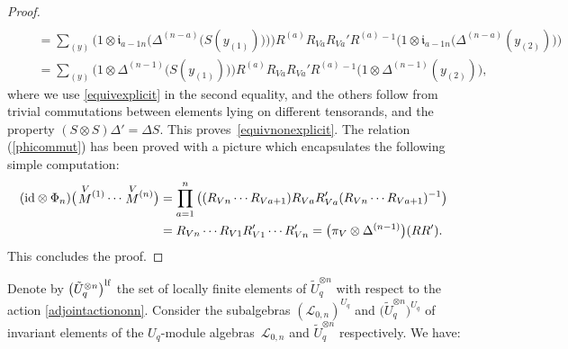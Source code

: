 \documentclass[pdftex]{sigma}%
\numberwithin{equation}{section}
\numberwithin{figure}{section}
\begin{document}
\begin{proof}
\begin{gather*}
\\ \qquad
{} = \sum_{(y)} \big(1 \otimes \mathfrak{i}_{a-1n}\big(\Delta^{(n-a)}\big( S(y_{(1)})\big)\big) \big) R^{(a)} R_{Va}R_{Va}' R^{(a)}{}^{\!-1} \big(1 \otimes \mathfrak{i}_{a-1n}\big(\Delta^{(n-a)}(y_{(2)})\big)\big)
\\ \qquad
{} = \sum_{(y)} \big(1 \otimes \Delta^{(n-1)}\big( S(y_{(1)})\big)\big) R^{(a)} R_{Va}R_{Va}' R^{(a)}{}^{\!-1} \big(1 \otimes \Delta^{(n-1)}(y_{(2)})\big),
 \end{gather*}
where we use \eqref{equivexplicit} in the second equality, and the others follow from trivial commutations between elements lying on different tensorands, and the property $( S \otimes S) \Delta' = \Delta S$. This proves~\eqref{equivnonexplicit}.
The relation (\ref{phicommut}) has been proved with a picture which encapsulates the following simple computation:
\begin{align*}
({\rm id} \otimes \Phi_n)\big(\!\stackrel{V}{M}{}^{\!\! (1)}\cdots \stackrel{V}{M}{}^{\!\! (n)}\big) & = \prod_{a=1}^{n} \big((R_{Vn}\cdots R_{Va+1}) R_{Va}R_{Va}' (R_{Vn}\cdots R_{Va+1})^{-1}\big)
\\
& =R_{Vn}\cdots R_{V1}R_{V1}'\cdots R_{Vn}'=\big(\pi_V\otimes \Delta^{(n-1)}\big)(RR').
\end{align*}
This concludes the proof.
\end{proof}

Denote by $\big({\tilde U}_q^{{\otimes} n}\big)^{\rm lf}$ the set of locally finite elements of ${\tilde U}_q^{{\otimes} n}$ with respect to the action \eqref{adjointactiononn}. Consider the subalgebras $({\mathcal L}_{0,n})^{U_q}$ and $\big(\tilde U_q^{\otimes n}\big)^{U_q}$ of invariant elements of the $U_q$-module algebras~${\mathcal L}_{0,n}$ and $\tilde U_q^{\otimes n}$ respectively. We have:
\end{document}
